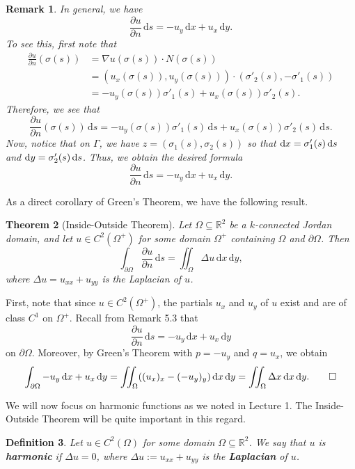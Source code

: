 \documentclass[10pt]{article}
\makeatletter
\newcommand{\R}{\mathbb{R}}
\newcommand{\dd}{\,\mathrm{d}}
\theoremstyle{newstyle}
\newtheorem{thm}{Theorem}[section]
\newtheorem{remark}[thm]{Remark}
\newtheorem{defn}[thm]{Definition}
\newenvironment{pf}[1][\proofname]{\par
  \pushQED{\qed}%
  \normalfont \topsep0\p@\relax
  \trivlist
  \item[\hskip\labelsep\scshape
  #1\@addpunct{.}]\ignorespaces
}{%
  \popQED\endtrivlist\@endpefalse
}
\makeatother
\begin{document}
\begin{remark}
In general, we have 
\[ \frac{\partial u}{\partial n} \dd s = -u_y \dd x + u_x \dd y. \]
To see this, first note that
\begin{align*}
    \frac{\partial u}{\partial n}(\sigma(s)) &= \nabla u(\sigma(s)) \cdot N(\sigma(s)) \\
    &= (u_x(\sigma(s)), u_y(\sigma(s))) \cdot (\sigma'_2(s), -\sigma'_1(s)) \\
    &= -u_y (\sigma(s)) \sigma'_1(s) + u_x(\sigma(s)) \sigma'_2(s).
\end{align*}
Therefore, we see that 
\[ \frac{\partial u}{\partial n}(\sigma(s))\dd s = -u_y(\sigma(s)) \sigma'_1(s)\dd s 
+ u_x(\sigma(s)) \sigma'_2(s)\dd s. \]
Now, notice that on $\Gamma$, we have $z = (\sigma_1(s), \sigma_2(s))$ so that 
${\rm d}x = \sigma'_1(s)\dd s$ and ${\rm d}y = \sigma'_2(s) \dd s$. Thus, 
we obtain the desired formula 
\[ \frac{\partial u}{\partial n} \dd s = -u_y \dd x + u_x \dd y. \]
\end{remark}

As a direct corollary of Green's Theorem, we have the following result. 

\begin{thm}[Inside-Outside Theorem]
Let $\Omega \subseteq \R^2$ be a $k$-connected Jordan domain, and let 
$u \in C^2(\Omega^+)$ for some domain $\Omega^+$ containing $\Omega$ and $\partial\Omega$. Then 
\[ \int_{\partial\Omega} \frac{\partial u}{\partial n}\dd s = \iint_\Omega \Delta u \dd x \dd y, \]
where $\Delta u = u_{xx} + u_{yy}$ is the Laplacian of $u$.
\end{thm}
\begin{pf}
First, note that since $u \in C^2(\Omega^+)$, the partials $u_x$ and $u_y$ of $u$ exist 
and are of class $C^1$ on $\Omega^+$. Recall from Remark 5.3 that 
\[ \frac{\partial u}{\partial n} \dd s = -u_y \dd x + u_x \dd y \]
on $\partial\Omega$. Moreover, by Green's Theorem with $p = -u_y$ and $q = u_x$, we obtain 
\[ \int_{\partial\Omega} -u_y \dd x + u_x \dd y = \iint_\Omega ((u_x)_x - (-u_y)_y)\dd x \dd y 
= \iint_\Omega \Delta x \dd x \dd y. \qedhere \]
\end{pf}

We will now focus on harmonic functions as we noted in Lecture 1. The Inside-Outside Theorem 
will be quite important in this regard. 

\begin{defn}
Let $u \in C^2(\Omega)$ for some domain $\Omega \subseteq \R^2$. We say that $u$ is 
{\bf harmonic} if $\Delta u = 0$, where $\Delta u := u_{xx} + u_{yy}$ is the {\bf Laplacian} of $u$.
\end{defn}
\end{document}
